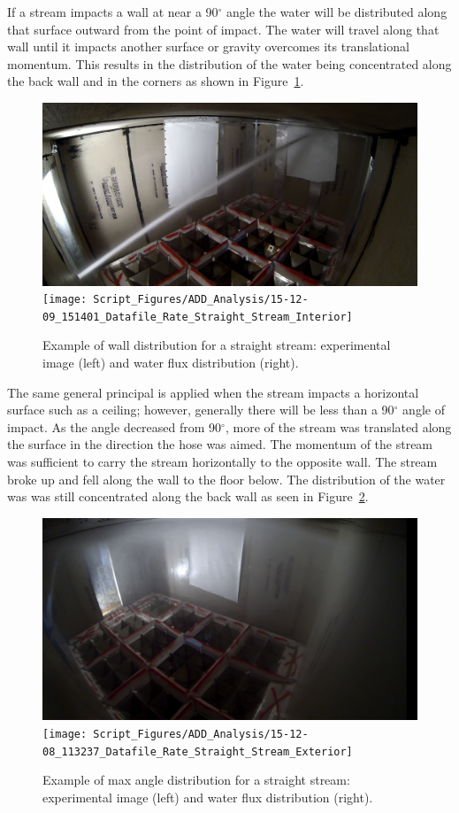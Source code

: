 \documentclass[12pt,oneside]{book}
\begin{document}
If a stream impacts a wall at near a 90$^{\circ}$ angle the water will be distributed along that surface outward from the point of impact. The water will travel along that wall until it impacts another surface or gravity overcomes its translational momentum. This results in the distribution of the water being concentrated along the back wall and in the corners as shown in Figure~\ref{fig:Interior_Atwall_Example}.

\begin{figure}[!ht]
\centering
\includegraphics[height=0.25\textwidth]{Figures/Water_Distribution/Nozzle_Directions/Interior_MaxAngleWall_SS_Inside_2} 
\texttt{[image: Script\_Figures/ADD\_Analysis/15-12-09\_151401\_Datafile\_Rate\_Straight\_Stream\_Interior]}
\caption[Example of At Wall Distribution]{Example of wall distribution for a straight stream: experimental image (left) and water flux distribution (right).}
\label{fig:Interior_Atwall_Example}
\end{figure}

The same general principal is applied when the stream impacts a horizontal surface such as a ceiling; however, generally there will be less than a 90$^{\circ}$ angle of impact. As the angle decreased from 90$^{\circ}$, more of the stream was translated along the surface in the direction the hose was aimed. The momentum of the stream was sufficient to carry the stream horizontally to the opposite wall. The stream broke up and fell along the wall to the floor below. The distribution of the water was was still concentrated along the back wall as seen in Figure~\ref{fig:MaxAngle_Exterior}.

\begin{figure}[!ht]
\centering
\includegraphics[height=0.25\textwidth]{Figures/Water_Distribution/Nozzle_Directions/Exterior_MaxAngleCeiling_SS} 
\texttt{[image: Script\_Figures/ADD\_Analysis/15-12-08\_113237\_Datafile\_Rate\_Straight\_Stream\_Exterior]}
\caption[Example of Max Angle Distribution]{Example of max angle distribution for a straight stream: experimental image (left) and water flux distribution (right).}
\label{fig:MaxAngle_Exterior}
\end{figure}
\end{document}
